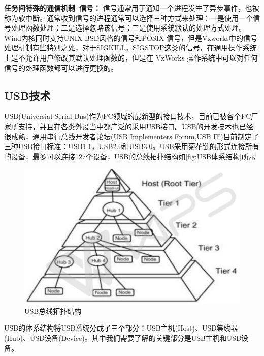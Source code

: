 \textbf{任务间特殊的通信机制--信号：} 信号通常用于通知一个进程发生了异步事件，也被称为软中断。通常收到信号的进程通常可以选择三种方式来处理：一是使用一个信号处理函数处理；二是选择忽略该信号；三是使用系统默认的处理方式处理。
Wind内核同时支持UNIX BSD风格的信号和POSIX 信号，但是Vxworks中的信号处理机制有些特别之处，对于SIGKILL，SIGSTOP这类的信号，在通用操作系统上是不允许用户修改其默认处理函数的，但是在 VxWorks 操作系统中可以对任何信号的处理函数都可以进行更换的。



\subsection{USB技术}
	USB(Universial Serial Bus)作为PC领域的最新型的接口技术，目前已被各个PC厂家所支持，并且在各类外设当中都广泛的采用USB接口。USB的开发技术也已经很成熟，通用串行总线开发者论坛(USB Implementers Forum,USB IF)目前制定了三种USB接口标准：USB1.1，USB2.0和USB3.0。USB采用菊花链的形式连接所有的设备，最多可以连接127个设备，USB的总线拓扑结构如\autoref{fig:USB体系结构}所示
\begin{figure}[!h]
\centering
\includegraphics[width=1.0\textwidth]{./graphics/usb-structure.pdf}
\caption{USB总线拓扑结构}\label{fig:USB体系结构}
\end{figure}


USB的体系结构将USB系统分成了三个部分：USB主机(Host)、USB集线器(Hub)、USB设备(Device)。其中我们需要了解的关键部分是USB主机和USB设备。
	

